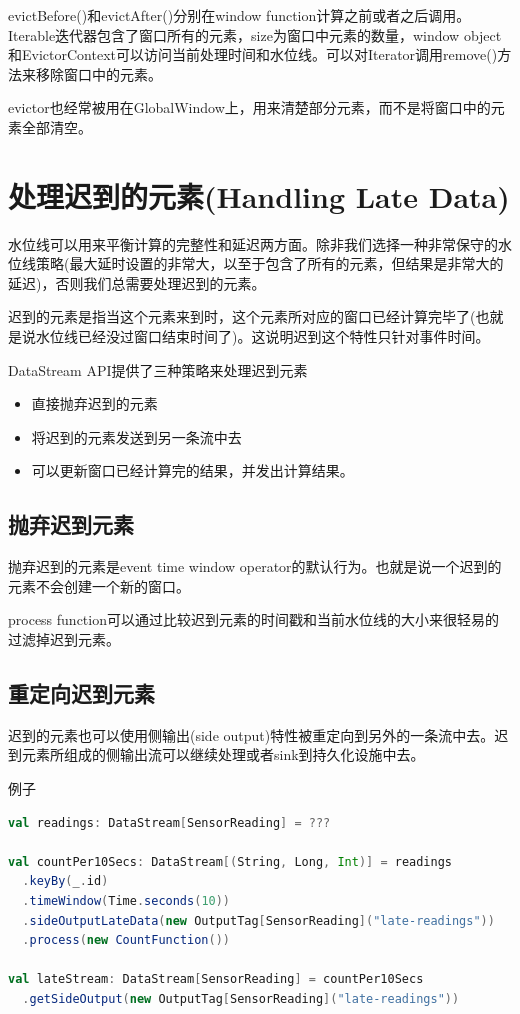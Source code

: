 \documentclass[oneside]{ctexbook}
\begin{document}
evictBefore()和evictAfter()分别在window function计算之前或者之后调用。Iterable迭代器包含了窗口所有的元素，size为窗口中元素的数量，window object和EvictorContext可以访问当前处理时间和水位线。可以对Iterator调用remove()方法来移除窗口中的元素。


evictor也经常被用在GlobalWindow上，用来清楚部分元素，而不是将窗口中的元素全部清空。

\section{处理迟到的元素(Handling Late Data)}

水位线可以用来平衡计算的完整性和延迟两方面。除非我们选择一种非常保守的水位线策略(最大延时设置的非常大，以至于包含了所有的元素，但结果是非常大的延迟)，否则我们总需要处理迟到的元素。

迟到的元素是指当这个元素来到时，这个元素所对应的窗口已经计算完毕了(也就是说水位线已经没过窗口结束时间了)。这说明迟到这个特性只针对事件时间。

DataStream API提供了三种策略来处理迟到元素

\begin{itemize}
  \item 直接抛弃迟到的元素
  \item 将迟到的元素发送到另一条流中去
  \item 可以更新窗口已经计算完的结果，并发出计算结果。
\end{itemize}

\subsection{抛弃迟到元素}

抛弃迟到的元素是event time window operator的默认行为。也就是说一个迟到的元素不会创建一个新的窗口。

process function可以通过比较迟到元素的时间戳和当前水位线的大小来很轻易的过滤掉迟到元素。

\subsection{重定向迟到元素}

迟到的元素也可以使用侧输出(side output)特性被重定向到另外的一条流中去。迟到元素所组成的侧输出流可以继续处理或者sink到持久化设施中去。

例子

\begin{lstlisting}[language=scala]
val readings: DataStream[SensorReading] = ???

val countPer10Secs: DataStream[(String, Long, Int)] = readings
  .keyBy(_.id)
  .timeWindow(Time.seconds(10))
  .sideOutputLateData(new OutputTag[SensorReading]("late-readings"))
  .process(new CountFunction())

val lateStream: DataStream[SensorReading] = countPer10Secs
  .getSideOutput(new OutputTag[SensorReading]("late-readings"))
\end{lstlisting}
\end{document}
